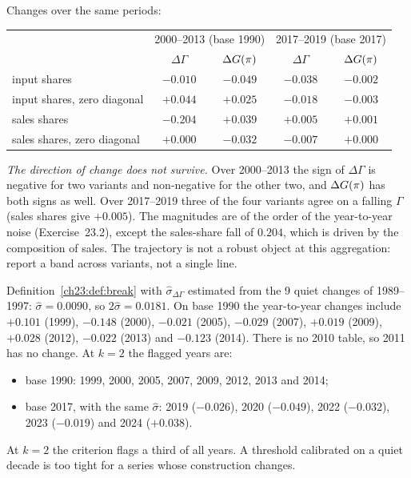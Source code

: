 \documentclass[../solutions_manual.tex]{subfiles}
\begin{document}
 Changes over the same periods:
\begin{center}\small
\begin{tabular}{lcccc}
\toprule
& \multicolumn{2}{c}{2000--2013 (base 1990)} & \multicolumn{2}{c}{2017--2019 (base 2017)} \\
& $\Delta\Gamma$ & $\Delta G(\pi)$ & $\Delta\Gamma$ & $\Delta G(\pi)$ \\
\midrule
input shares & $-0.010$ & $-0.049$ & $-0.038$ & $-0.002$ \\
input shares, zero diagonal & $+0.044$ & $+0.025$ & $-0.018$ & $-0.003$ \\
sales shares & $-0.204$ & $+0.039$ & $+0.005$ & $+0.001$ \\
sales shares, zero diagonal & $+0.000$ & $-0.032$ & $-0.007$ & $+0.000$ \\
\bottomrule
\end{tabular}
\end{center}
\emph{The direction of change does not survive.} Over 2000--2013 the sign of $\Delta\Gamma$ is negative for two variants and non-negative for the other two, and $\Delta G(\pi)$ has both signs as well. Over 2017--2019 three of the four variants agree on a falling $\Gamma$ (sales shares give $+0.005$). The magnitudes are of the order of the year-to-year noise (Exercise~23.2), except the sales-share fall of $0.204$, which is driven by the composition of sales. The trajectory is not a robust object at this aggregation: report a band across variants, not a single line.


 Definition~\ref{ch23:def:break} with $\hat\sigma_{\Delta\Gamma}$ estimated from the 9 quiet changes of 1989--1997: $\hat\sigma = 0.0090$, so $2\hat\sigma = 0.0181$. On base 1990 the year-to-year changes include $+0.101$ (1999), $-0.148$ (2000), $-0.021$ (2005), $-0.029$ (2007), $+0.019$ (2009), $+0.028$ (2012), $-0.022$ (2013) and $-0.123$ (2014). There is no 2010 table, so 2011 has no change. At $k = 2$ the flagged years are:
\begin{itemize}
\item base 1990: 1999, 2000, 2005, 2007, 2009, 2012, 2013 and 2014;
\item base 2017, with the same $\hat\sigma$: 2019 ($-0.026$), 2020 ($-0.049$), 2022 ($-0.032$), 2023 ($-0.019$) and 2024 ($+0.038$).
\end{itemize}
At $k = 2$ the criterion flags a third of all years. A threshold calibrated on a quiet decade is too tight for a series whose construction changes.
\end{document}
